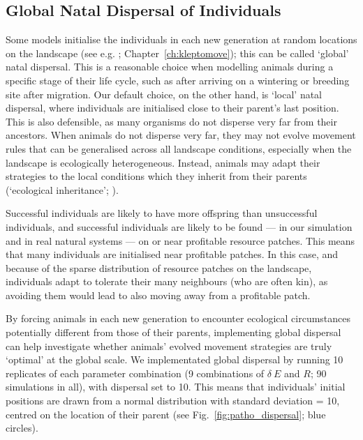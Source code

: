 \subsection*{Global Natal Dispersal of Individuals}

Some models initialise the individuals in each new generation at random locations on the landscape (see e.g. \cite*{gupte2021a}; Chapter~\ref{ch:kleptomove}); this can be called `global' natal dispersal.
This is a reasonable choice when modelling animals during a specific stage of their life cycle, such as after arriving on a wintering or breeding site after migration.
Our default choice, on the other hand, is `local' natal dispersal, where individuals are initialised close to their parent's last position.
This is also defensible, as many organisms do not disperse very far from their ancestors.
When animals do not disperse very far, they may not evolve movement rules that can be generalised across all landscape conditions, especially when the landscape is ecologically heterogeneous.
Instead, animals may adapt their strategies to the local conditions which they inherit from their parents ({`ecological inheritance'}; \cite{badyaev2009}).

Successful individuals are likely to have more offspring than unsuccessful individuals, and successful individuals are likely to be found --- in our simulation and in real natural systems --- on or near profitable resource patches.
This means that many individuals are initialised near profitable patches.
In this case, and because of the sparse distribution of resource patches on the landscape, individuals adapt to tolerate their many neighbours (who are often kin), as avoiding them would lead to also moving away from a profitable patch.

By forcing animals in each new generation to encounter ecological circumstances potentially different from those of their parents, implementing global dispersal can help investigate whether animals' evolved movement strategies are truly `optimal' at the global scale.
We implementated global dispersal by running 10 replicates of each parameter combination (9 combinations of $\delta~E$ and $R$; 90 simulations in all), with dispersal set to 10.
This means that individuals' initial positions are drawn from a normal distribution with standard deviation = 10, centred on the location of their parent (see Fig.~\ref{fig:patho_dispersal}; blue circles).

